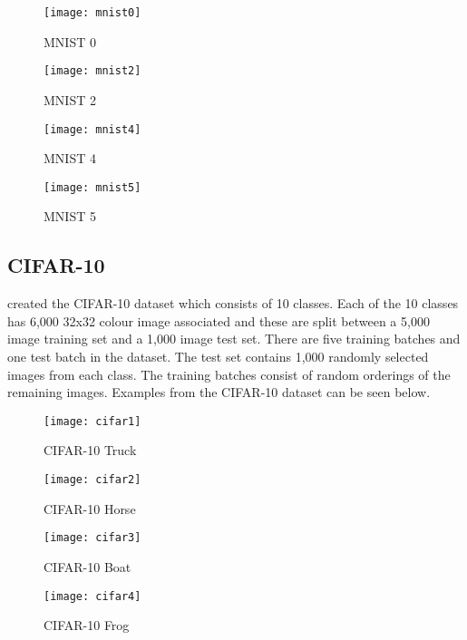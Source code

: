 \begin{figure}[h] 
  \label{mnistDataset} 
  \begin{minipage}[b]{0.25\linewidth}
    \centering
    \texttt{[image: mnist0]} 
    \caption{MNIST 0} 
    \vspace{4ex}
  \end{minipage}%
  \begin{minipage}[b]{0.25\linewidth}
    \centering
    \texttt{[image: mnist2]} 
    \caption{MNIST 2} 
  \label{fig:page2}
    \vspace{4ex}
  \end{minipage} 
  \begin{minipage}[b]{0.25\linewidth}
    \centering
    \texttt{[image: mnist4]} 
    \caption{MNIST 4} 
    \vspace{4ex}
  \end{minipage}%
  \begin{minipage}[b]{0.25\linewidth}
    \centering
    \texttt{[image: mnist5]} 
    \caption{MNIST 5} 
    \vspace{4ex}
  \end{minipage} 
\end{figure}

\tocless\subsection{CIFAR-10}
\parencite{cifar} created the CIFAR-10 dataset which consists of 10 classes.
Each of the 10 classes has 6,000 32x32 colour image associated and these are split between a 5,000 image training set and a 1,000 image test set.
There are five training batches and one test batch in the dataset.
The test set contains 1,000 randomly selected images from each class.
The training batches consist of random orderings of the remaining images.
Examples from the CIFAR-10 dataset can be seen below.

\begin{figure}[h] 
  \label{cifar10} 
  \begin{minipage}[b]{0.25\linewidth}
    \centering
    \texttt{[image: cifar1]} 
    \caption{CIFAR-10 Truck} 
    \vspace{4ex}
  \end{minipage}%
  \begin{minipage}[b]{0.25\linewidth}
    \centering
    \texttt{[image: cifar2]} 
    \caption{CIFAR-10 Horse} 
  \label{fig:page2}
    \vspace{4ex}
  \end{minipage} 
  \begin{minipage}[b]{0.25\linewidth}
    \centering
    \texttt{[image: cifar3]} 
    \caption{CIFAR-10 Boat} 
    \vspace{4ex}
  \end{minipage}%
  \begin{minipage}[b]{0.25\linewidth}
    \centering
    \texttt{[image: cifar4]} 
    \caption{CIFAR-10 Frog} 
    \vspace{4ex}
  \end{minipage} 
\end{figure}